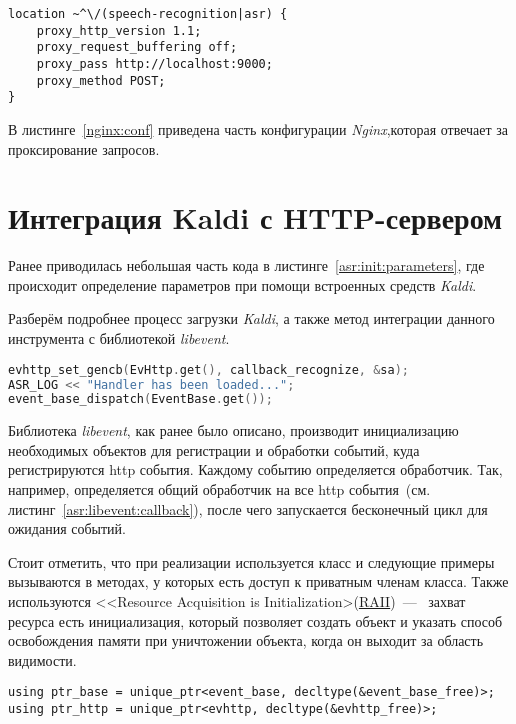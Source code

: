 \begin{lstlisting}[caption={Пример конфигурации Nginx},label={nginx:conf}]
location ~^\/(speech-recognition|asr) {
    proxy_http_version 1.1;
    proxy_request_buffering off;
    proxy_pass http://localhost:9000;
    proxy_method POST;
}

\end{lstlisting}

В листинге~\ref{nginx:conf} приведена часть конфигурации \textit{Nginx},которая
отвечает за проксирование запросов.

\section{Интеграция Kaldi с HTTP-сервером}
Ранее приводилась небольшая часть кода в листинге~\ref{asr:init:parameters}, где
происходит определение параметров при помощи встроенных средств \textit{Kaldi}.

Разберём подробнее процесс загрузки \textit{Kaldi}, а также метод интеграции
данного инструмента с библиотекой \textit{libevent}.

\begin{lstlisting}[caption={Создание обработчика событий},label=asr:libevent:callback,language=C++]
evhttp_set_gencb(EvHttp.get(), callback_recognize, &sa);
ASR_LOG << "Handler has been loaded...";
event_base_dispatch(EventBase.get());

\end{lstlisting}
Библиотека \textit{libevent}, как ранее было описано, производит инициализацию
необходимых объектов для регистрации и обработки событий, куда регистрируются
http события. Каждому событию определяется обработчик. Так, например, определяется
общий обработчик на все http события~(см. листинг~\ref{asr:libevent:callback}),
после чего запускается бесконечный цикл для ожидания событий.

Стоит отметить, что при реализации используется класс и следующие примеры вызываются
в методах, у которых есть доступ к приватным членам класса. Также используются
<<Resource Acquisition is Initialization>(\hyperlink{raii}{RAII})~---~
захват ресурса есть инициализация, который позволяет создать объект и указать
способ освобождения памяти при уничтожении объекта, когда он выходит за область
видимости.

\begin{lstlisting}[caption={Описание некоторых типов данных}, label={lst:class:types}]
using ptr_base = unique_ptr<event_base, decltype(&event_base_free)>;
using ptr_http = unique_ptr<evhttp, decltype(&evhttp_free)>;
\end{lstlisting}


